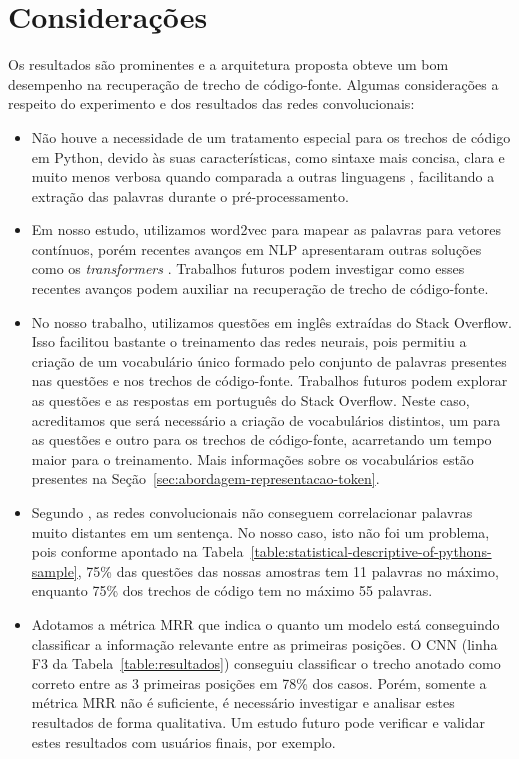 \section{Considerações}
\label{sec:consideracoes-resultados}

Os resultados são prominentes e a arquitetura proposta obteve um bom desempenho na recuperação de trecho de código-fonte. Algumas considerações a respeito do experimento e dos resultados das redes convolucionais:

\begin{itemize}
    \item Não houve a necessidade de um tratamento especial para os trechos de código em Python, devido às suas características, como sintaxe mais concisa, clara e muito menos verbosa quando comparada a outras linguagens \cite{theodora-introductory-programming-python-2015}, facilitando a extração das palavras durante o pré-processamento. 
    
    \item Em nosso estudo, utilizamos \gls{word2vec} para mapear as palavras para vetores contínuos, porém recentes avanços em NLP apresentaram outras soluções como os \textit{transformers} \cite{attention-is-all-you-need-2017}. Trabalhos futuros podem investigar como esses recentes avanços podem auxiliar na recuperação de trecho de código-fonte.
    
    \item No nosso trabalho, utilizamos questões em inglês extraídas do Stack Overflow. Isso facilitou bastante o treinamento das redes neurais, pois permitiu a criação de um vocabulário único formado pelo conjunto de palavras presentes nas questões e nos trechos de código-fonte. Trabalhos futuros podem explorar as questões e as respostas em português do Stack Overflow. Neste caso, acreditamos que será necessário a criação de vocabulários distintos, um para as questões e outro para os trechos de código-fonte, acarretando um tempo maior para o treinamento. Mais informações sobre os vocabulários estão presentes na Seção~\ref{sec:abordagem-representacao-token}.
    
    \item Segundo , as redes convolucionais não conseguem correlacionar palavras muito distantes em um sentença. No nosso caso, isto não foi um problema, pois conforme apontado na Tabela~\ref{table:statistical-descriptive-of-pythons-sample}, 75\% das questões das nossas amostras tem 11 palavras no máximo, enquanto 75\% dos trechos de código tem no máximo 55 palavras.
    
    \item Adotamos a métrica MRR que indica o quanto um modelo está conseguindo classificar a informação relevante entre as primeiras posições. O CNN (linha F3 da Tabela~\ref{table:resultados}) conseguiu classificar o trecho anotado como correto entre as 3 primeiras posições em 78\% dos casos. Porém, somente a métrica MRR não é suficiente, é necessário investigar e analisar estes resultados de forma qualitativa. Um estudo futuro pode verificar e validar estes resultados com usuários finais, por exemplo. 
\end{itemize}


